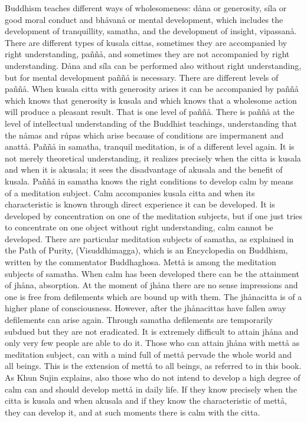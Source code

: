 \documentclass[12pt,twoside]{article}
\begin{document}
Buddhism teaches different ways of wholesomeness: d{\aa}na or
generosity, s\'ila or good moral conduct and bh{\aa}van{\aa} or mental
development, which includes the development of tranquillity, samatha,
and the development of insight, vipassan{\aa}. There are different
types of kusala cittas, sometimes they are accompanied by right
understanding, pa\~n\~n{\aa}, and sometimes they are not accompanied by
right understanding. D{\aa}na and s\'ila can be performed also without
right understanding, but for mental development pa\~n\~n{\aa} is
necessary. There are different levels of pa\~n\~n{\aa}. When kusala
citta with generosity arises it can be accompanied by pa\~n\~n{\aa}
which knows that generosity is kusala and which knows that a wholesome
action will produce a pleasant result. That is one level of
pa\~n\~n{\aa}. There is pa\~n\~n{\aa} at the level of intellectual
understanding of the Buddhist teachings, understanding that the
n{\aa}mas and r\'upas which arise because of conditions are impermanent
and anatt{\aa}. Pa\~n\~n{\aa} in samatha, tranquil meditation, is of a
different level again. It is not merely theoretical understanding, it
realizes precisely when the citta is kusala and when it is akusala; it
sees the disadvantage of akusala and the benefit of kusala.
Pa\~n\~n{\aa} in samatha knows the right conditions to develop calm by
means of a meditation subject. Calm accompanies kusala citta and when
its characteristic is known through direct experience it can be
developed. It is developed by concentration on one of the meditation
subjects, but if one just tries to concentrate on one object without
right understanding, calm cannot be developed. There are particular
meditation subjects of samatha, as explained in the Path of Purity,
(Visuddhimagga), which is an Encyclopedia on Buddhism, written by the
commentator Buddhaghosa. Mett{\aa} is among the meditation subjects of
samatha. When calm has been developed there can be the attainment of
jh{\aa}na, absorption. At the moment of jh{\aa}na there are no sense
impressions and one is free from defilements which are bound up with
them. The jh{\aa}nacitta is of a higher plane of consciousness.
However, after the jh{\aa}nacittas have fallen away defilements can
arise again. Through samatha defilements are temporarily subdued but
they are not eradicated. It is extremely difficult to attain jh{\aa}na
and only very few people are able to do it. Those who can attain
jh{\aa}na with mett{\aa} as meditation subject, can with a mind full of
mett{\aa} pervade the whole world and all beings. This is the
{\textasciigrave}{\textasciigrave}extension of mett{\aa} to all
beings{\textquotesingle}{\textquotesingle}, as referred to in this
book. As Khun Sujin explains, also those who do not intend to develop a
high degree of calm can and should develop mett{\aa} in daily life. If
they know precisely when the citta is kusala and when akusala and if
they know the characteristic of mett{\aa}, they can develop it, and at
such moments there is calm with the citta. 
\end{document}
